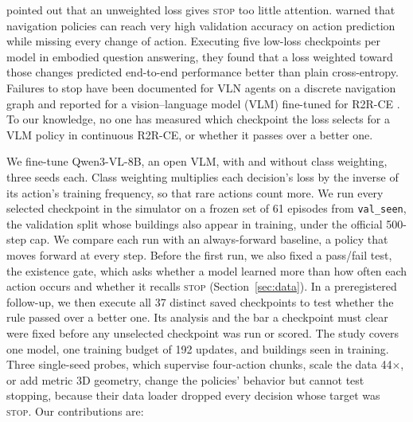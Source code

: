\citet{xiang2020l2stop} pointed out that an unweighted loss gives \textsc{stop} too little
attention. \citet{wijmans2019eqa} warned that navigation policies can reach very high validation
accuracy on action prediction while missing every change of action. Executing five low-loss
checkpoints per model in embodied question answering, they found that a loss weighted toward those
changes predicted end-to-end performance better than plain cross-entropy. Failures to stop have been
documented for VLN agents on a discrete navigation graph \citep{zhao2023mindthegap} and reported for
a vision--language model (VLM) fine-tuned for R2R-CE \citep{dang2026rynnbrain}. To our knowledge, no
one has measured which checkpoint the loss selects for a VLM policy in continuous R2R-CE, or whether
it passes over a better one.

We fine-tune Qwen3-VL-8B, an open VLM, with and without class weighting, three seeds each. Class
weighting multiplies each decision's loss by the inverse of its action's training frequency, so that
rare actions count more. We run every selected checkpoint in the simulator on a frozen set of 61
episodes from \texttt{val\_seen}, the validation split whose buildings also appear in training, under
the official 500-step cap. We compare each run with an always-forward baseline, a policy that moves
forward at every step. Before the first run, we also fixed a pass/fail test, the existence gate,
which asks whether a model learned more than how often each action occurs and whether it recalls
\textsc{stop} (Section~\ref{sec:data}). In a preregistered follow-up, we then execute all 37
distinct saved checkpoints to test whether the rule passed over a better one. Its analysis and the
bar a checkpoint must clear were fixed before any unselected checkpoint was run or scored. The study covers
one model, one training budget of 192 updates, and buildings seen in training. Three single-seed
probes, which supervise four-action chunks, scale the data 44$\times$, or add metric 3D geometry,
change the policies' behavior but cannot test stopping, because their data loader dropped every
decision whose target was \textsc{stop}. Our contributions are:
